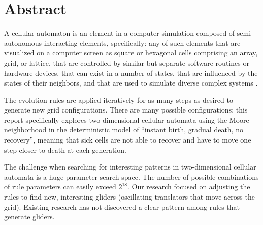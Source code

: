 \documentclass[12pt]{article}
\numberwithin{figure}{section} %
\begin{document}

\thispagestyle{plain}
\section*{\centering Abstract}

A cellular automaton is an element in a computer simulation composed of semi-autonomous interacting elements, specifically: any of such elements that are visualized on a computer screen as square or hexagonal cells comprising an array, grid, or lattice, that are controlled by similar but separate software routines or hardware devices, that can exist in a number of states, that are influenced by the states of their neighbors, and that are used to simulate diverse complex systems \cite{MW}. 

The evolution rules are applied iteratively for as many steps as desired to generate new grid configurations. There are many possible configurations; this report specifically explores two-dimensional cellular automata using the Moore neighborhood in the deterministic model of “instant birth, gradual death, no recovery”, meaning that sick cells are not able to recover and have to move one step closer to death at each generation. 

The challenge when searching for interesting patterns in two-dimensional cellular automata is a huge parameter search space. The number of possible combinations of rule parameters can easily exceed $2^{18}$. Our research focused on adjusting the rules to find new, interesting gliders (oscillating translators that move across the grid). Existing research has not discovered a clear pattern among rules that generate gliders. 
\end{document}

